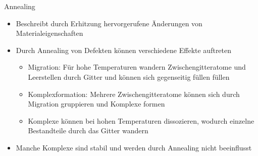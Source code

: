 \documentclass[aspectratio=43, 10pt]{beamer}
\begin{document}
\begin{frame}{Annealing}
  \begin{itemize}
    \item Beschreibt durch Erhitzung hervorgerufene Änderungen von Materialeigenschaften
    \medskip
    \item Durch Annealing von Defekten können verschiedene Effekte auftreten
      \begin{itemize}
        \item Migration: Für hohe Temperaturen wandern Zwischengitteratome und Leerstellen durch Gitter und
        können sich gegenseitig füllen füllen
        \medskip
        \item Komplexformation: Mehrere Zwischengitteratome können sich durch Migration gruppieren und Komplexe formen
        \medskip
        \item Komplexe können bei hohen Temperaturen dissozieren, wodurch einzelne Bestandteile durch das Gitter wandern
      \end{itemize}
    \medskip
    \item Manche Komplexe sind stabil und werden durch Annealing nicht beeinflusst
  \end{itemize}
\end{frame}
\end{document}
